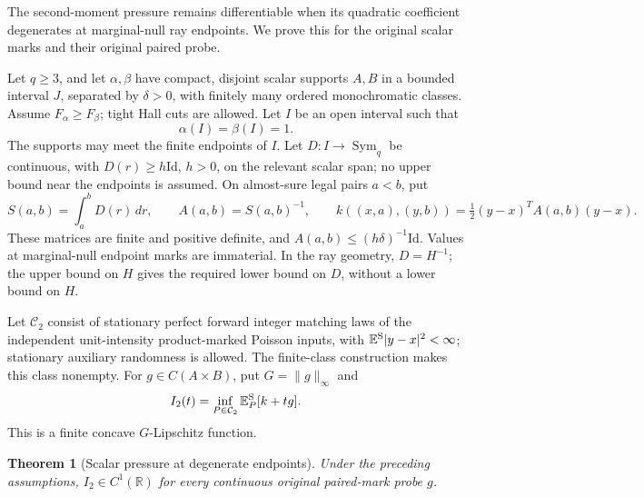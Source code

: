 \documentclass[11pt,reqno]{amsart}
\newtheorem{theorem}{Theorem}[section]
\theoremstyle{definition}
\theoremstyle{remark}
\numberwithin{equation}{section}
\newcommand{\R}{\mathbb R}
\newcommand{\E}{\mathbb E}
\begin{document}
The second-moment pressure remains differentiable when its quadratic
coefficient degenerates at marginal-null ray endpoints. We prove this
for the original scalar marks and their original paired probe.

Let \(q\ge3\), and let \(\alpha,\beta\) have compact, disjoint
scalar supports \(A,B\) in a bounded interval \(J\), separated by
\(\delta>0\), with finitely many ordered monochromatic classes.
Assume \(F_\alpha\ge F_\beta\); tight Hall cuts are allowed.
Let \(I\) be an open interval such that
\begin{equation}
\label{degenerate-scalar-interior-mass}
                     \alpha(I)=\beta(I)=1.
\end{equation}
The supports may meet the finite endpoints of \(I\). Let
\(D:I\to\operatorname{Sym}_q\) be continuous, with
\(D(r)\ge h\mathrm{Id}\), \(h>0\), on the relevant scalar span;
no upper bound near the endpoints is assumed. On almost-sure legal
pairs \(a<b\), put
\begin{equation}
\label{degenerate-scalar-kernel}
 S(a,b)=\int_a^bD(r)\,dr,\qquad A(a,b)=S(a,b)^{-1},\qquad
 k((x,a),(y,b))=\tfrac12(y-x)^TA(a,b)(y-x).
\end{equation}
These matrices are finite and positive definite, and
\(A(a,b)\le(h\delta)^{-1}\mathrm{Id}\). Values at marginal-null
endpoint marks are immaterial. In the ray geometry, \(D=H^{-1}\);
the upper bound on \(H\) gives the required lower bound on \(D\),
without a lower bound on \(H\).

Let \(\mathcal C_2\) consist of stationary perfect forward integer
matching laws of the independent unit-intensity product-marked Poisson
inputs, with \(\E^{\rm S}|y-x|^2<\infty\); stationary auxiliary
randomness is allowed. The finite-class construction makes this class
nonempty. For \(g\in C(A\times B)\), put \(G=\|g\|_\infty\) and
\begin{equation}
\label{degenerate-scalar-pressure}
 I_2(t)=\inf_{P\in\mathcal C_2}\E_P^{\rm S}[k+tg].
\end{equation}
This is a finite concave \(G\)-Lipschitz function.

\begin{theorem}[Scalar pressure at degenerate endpoints]
\label{degenerate-scalar-c1}
Under the preceding assumptions, \(I_2\in C^1(\R)\) for every
continuous original paired-mark probe \(g\).
\end{theorem}
\end{document}
